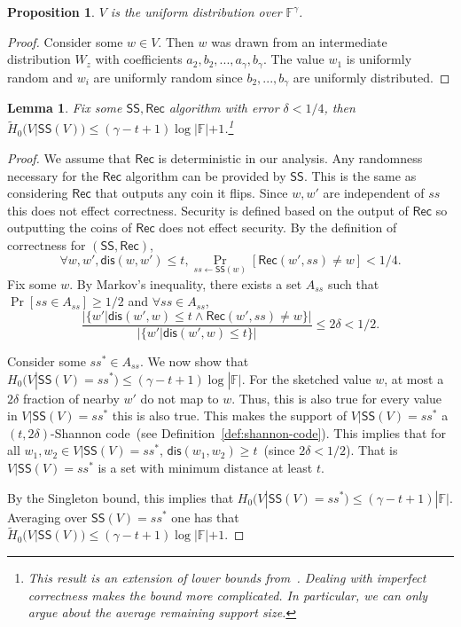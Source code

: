 \documentclass[11pt]{article}
\newtheorem{lemma}[theorem]{Lemma}
\newtheorem{proposition}[theorem]{Proposition}
\newcommand{\defref}[1]{\mbox{Definition~\ref{#1}}}
\newcommand{\class}[1]{{\ensuremath{\mathsf{#1}}}}
\newcommand{\sketch}{\ensuremath{\class{SS}}\xspace}
\newcommand{\rec}{\ensuremath{\class{Rec}}\xspace}
\newcommand{\dis}{\ensuremath{\mathsf{dis}}}
\begin{document}
\begin{proposition}
\label{prop:distribution uniform} $V$ is the uniform distribution over $\mathbb{F}^\gamma$.
\end{proposition}
\begin{proof}
Consider some $w\in V$.  Then $w$ was drawn from an intermediate distribution $W_z$ with coefficients $a_2, b_2, ..., a_\gamma , b_\gamma$.  The value $w_1$ is uniformly random and $w_i$ are uniformly random since $b_2,..., b_\gamma$ are uniformly distributed.
\end{proof}


\begin{lemma}
\label{lem:secure sketch entropy loss}
Fix some $\sketch, \rec$ algorithm with error $\delta < 1/4$, then $\tilde{H}_0(V | \sketch(V)) \le (\gamma-t+1)\log |\mathbb{F}|+1$.\footnote{This result is an extension of lower bounds from~\cite[Appendix C]{DBLP:journals/siamcomp/DodisORS08}.  Dealing with imperfect correctness makes the bound more complicated.  In particular, we can only argue about the average remaining support size.}
\end{lemma}
\begin{proof}
We assume that $\rec$ is deterministic in our analysis.  Any randomness necessary for the \rec algorithm can be provided by \sketch.  This is the same as considering $\rec$ that outputs any coin it flips.  Since $w, w'$ are independent of $ss$ this does not effect correctness.  Security is defined based on the output of $\rec$ so outputting the coins of $\rec$ does not effect security.
By the definition of correctness for $(\sketch, \rec)$, 
\[
\forall w, w', \dis(w, w') \le t, \Pr_{ss\leftarrow \sketch(w)} [\rec(w', ss) \neq w] < 1/4.
\]
Fix some $w$.  
By Markov's inequality, there exists a set $A_{ss}$ such that $\Pr[ss\in A_{ss}]\ge 1/2$ and $\forall ss\in A_{ss}$, 
\[
\frac{|\{w' | \dis (w', w)\le t \wedge \rec(w', ss) \neq w\}|}{|\{w'|\dis(w', w) \le t\}|}\le 2\delta < 1/2.\]

Consider some $ss^*\in A_{ss}$.  We now show that $H_0(V | \sketch(V) = ss^*) \le (\gamma-t+1)\log |\mathbb{F}|$.  For the sketched value $w$, at most a $2\delta$ fraction of nearby $w'$ do not map to $w$. Thus, this is also true for every value in $V|\sketch(V) = ss^*$ this is also true.    This makes the support of $V|\sketch(V)=ss^*$ a $(t, 2\delta)$-Shannon code~(see \defref{def:shannon-code}).  This implies that for all $w_1, w_2 \in V|\sketch(V)=ss^*$, $\dis(w_1, w_2)\ge t$~(since $2\delta< 1/2$).  That is $V|\sketch(V)=ss^*$ is a set with minimum distance at least $t$.  


By the Singleton bound, this implies that $H_0(V |\sketch(V)=ss^*) \le (\gamma -t+1 )|\mathbb{F}|$.  Averaging over $\sketch(V)=ss^*$ one has that $\tilde{H}_0(V|\sketch(V)) \le (\gamma -t +1) \log|\mathbb{F}| +1$.
\end{proof}
\end{document}
